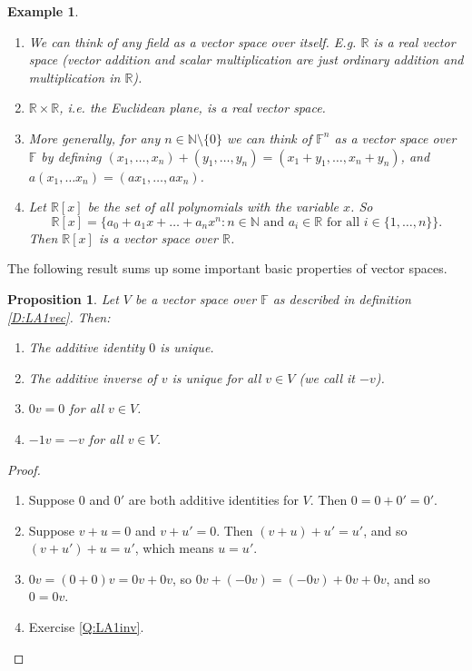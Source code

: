 \documentclass{article}
\theoremstyle{plain}
\newtheorem{proposition}[theorem]{Proposition}{\bfseries}{\itshape}
\newtheorem{example}[theorem]{Example}{\bfseries}{\upshape}
\newcommand{\bN}{\mathbb{N}}
\newcommand{\bR}{\mathbb{R}}
\newcommand{\bF}{\mathbb{F}}
\begin{document}
\begin{example}\label{E:LA1vec}\mbox{}
\begin{enumerate}
\item We can think of any field as a vector space over itself. E.g. $\bR$ is a real vector space (vector addition and scalar multiplication are just ordinary addition and multiplication in $\bR$).
\item $\bR\times \bR$, i.e. the Euclidean plane, is a real vector space.
\item More generally, for any $n\in\bN\setminus\{0\}$ we can think of $\bF^n$ as a vector space over $\bF$ by defining $(x_1,\ldots,x_n)+(y_1,\ldots,y_n) = (x_1+y_1,\ldots,x_n+ y_n)$, and $a(x_1,\ldots x_n)=(ax_1,\ldots,ax_n)$.
\item Let $\bR[x]$ be the set of all polynomials with the variable $x$. So 
\[\bR[x] = \{ a_0 + a_1x + \ldots +a_nx^n: n\in\bN\text{ and } a_i\in\bR\text{ for all }i\in\{1,\ldots,n\}\}.\]
Then $\bR[x]$ is a vector space over $\bR$.
\end{enumerate}
\end{example}

The following result sums up some important basic properties of vector spaces.

\begin{proposition}\label{P:LA1props}
Let $V$ be a vector space over $\bF$ as described in definition \ref{D:LA1vec}. Then:
\begin{enumerate}
\item The additive identity $0$ is unique.
\item The additive inverse of $v$ is unique for all $v\in V$ (we call it $-v$).
\item $0v = 0$ for all $v\in V$.
\item $-1v = -v$ for all $v\in V$.
\end{enumerate}
\end{proposition}
\begin{proof}\mbox{}
\begin{enumerate}
\item Suppose $0$ and $0'$ are both additive identities for $V$. Then $0 = 0 + 0' = 0'$.
\item Suppose $v+u = 0$ and $v + u' =0$. Then $(v + u) + u' = u'$, and so $(v + u') + u = u'$, which means $u = u'$.
\item $0v = (0+0)v = 0v + 0v$, so $0v +(-0v) = (-0v) + 0v + 0v$, and so $0 = 0v$.
\item Exercise \ref{Q:LA1inv}.
\end{enumerate}
\end{proof}
\end{document}

